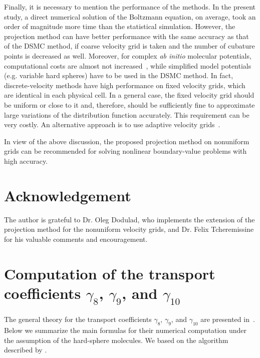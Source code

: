 \documentclass[review]{elsarticle}
\begin{document}
Finally, it is necessary to mention the performance of the methods.
In the present study, a direct numerical solution of the Boltzmann equation, on average,
took an order of magnitude more time than the statistical simulation.
However, the projection method can have better performance with the same accuracy as that of the DSMC method,
if coarse velocity grid is taken and the number of cubature points is decreased as well.
Moreover, for complex \textit{ab initio} molecular potentials, computational costs are almost not increased~\citep{Dodulad2014},
while simplified model potentials (e.g. variable hard spheres) have to be used in the DSMC method.
In fact, discrete-velocity methods have high performance on fixed velocity grids,
which are identical in each physical cell.
In a general case, the fixed velocity grid should be uniform or close to it and, therefore,
should be sufficiently fine to approximate large variations of the distribution function accurately.
This requirement can be very costly. An alternative approach is to use adaptive velocity grids~\citep{Kolobov2013}.

In view of the above discussion, the proposed projection method on nonuniform grids can be recommended
for solving nonlinear boundary-value problems with high accuracy.

\section*{Acknowledgement}

The author is grateful to Dr. Oleg Dodulad, who implements the extension
of the projection method for the nonuniform velocity grids,
and Dr. Felix Tcheremissine for his valuable comments and encouragement.

\appendix

\section{Computation of the transport coefficients \(\gamma_8\), \(\gamma_9\), and \(\gamma_{10}\)}
\label{sec:gamma_coeffs}

The general theory for the transport coefficients \(\gamma_8\), \(\gamma_9\), and \(\gamma_{10}\)
are presented in~\citep{Sone2000, Sone2002}.
Below we summarize the main formulas for their numerical computation
under the assumption of the hard-sphere molecules.
We based on the algorithm described by \citet{Ohwada1992}.
\end{document}
